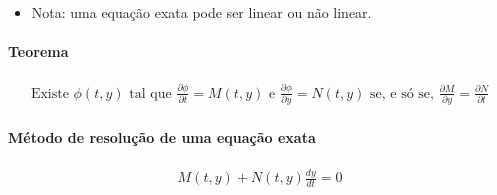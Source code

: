 \documentclass{article}
\begin{document}
\begin{itemize}
    \item Nota: uma equação exata pode ser linear ou não linear.
\end{itemize}

\smallskip

\paragraph{Teorema}
\begin{gather*}
\text{Existe } \phi(t,y) \text{ tal que } \frac{\partial \phi}{\partial t} = M(t,y) \text{ e } \frac{\partial \phi}{\partial y} = N(t,y) \text{ se, e só se, } \frac{\partial M}{\partial y} = \frac{\partial N}{\partial t}
\end{gather*}


\paragraph{Método de resolução de uma equação exata}
\label{par: metodo-resolucao-edo-exata}
\begin{gather*}
M(t,y) + N(t,y) \frac{dy}{dt} = 0
\end{gather*}
\end{document}

